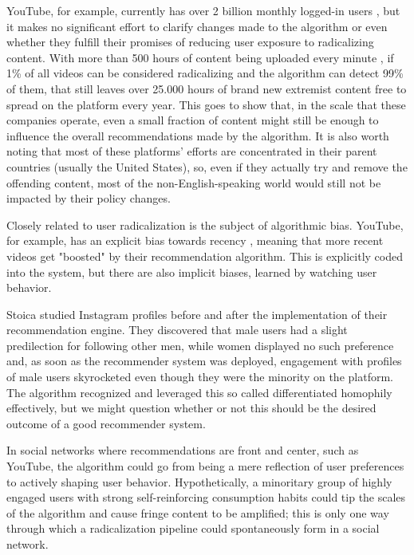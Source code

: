 YouTube, for example, currently has over 2 billion monthly logged-in users
\citep{}, but it makes no significant effort to clarify changes made to the %
algorithm or even whether they fulfill their promises of reducing user exposure
to radicalizing content. With more than 500 hours of content being uploaded
every minute \citep{}, if 1\% of all videos can be considered radicalizing and %
the algorithm can detect 99\% of them, that still leaves over 25.000 hours of
brand new extremist content free to spread on the platform every year. This goes
to show that, in the scale that these companies operate, even a small fraction
of content might still be enough to influence the overall recommendations made
by the algorithm. It is also worth noting that most of these platforms' efforts
are concentrated in their parent countries (usually the United States), so, even
if they actually try and remove the offending content, most of the
non-English-speaking world would still not be impacted by their policy changes.

Closely related to user radicalization is the subject of algorithmic bias.
YouTube, for example, has an explicit bias towards recency
\citep{covington_deep_2016}, meaning that more recent videos get "boosted" by
their recommendation algorithm. This is explicitly coded into the system, but
there are also implicit biases, learned by watching user behavior.

Stoica \citep{stoica_algorithmic_2018} studied Instagram profiles before and
after the implementation of their recommendation engine. They discovered that
male users had a slight predilection for following other men, while women
displayed no such preference and, as soon as the recommender system was
deployed, engagement with profiles of male users skyrocketed even though they
were the minority on the platform. The algorithm recognized and leveraged this
so called differentiated homophily effectively, but we might question whether or
not this should be the desired outcome of a good recommender system.

In social networks where recommendations are front and center, such as YouTube,
the algorithm could go from being a mere reflection of user preferences to
actively shaping user behavior. Hypothetically, a minoritary group of highly
engaged users with strong self-reinforcing consumption habits could tip the
scales of the algorithm and cause fringe content to be amplified; this is only
one way through which a radicalization pipeline could spontaneously form in a
social network.


